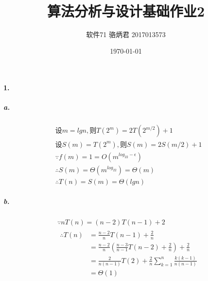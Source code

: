 \documentclass[UTF8]{ctexart}
\title{算法分析与设计基础作业2}
\author{软件71 骆炳君 2017013573}
\date{\today}
\begin{document}
\maketitle
{}

\paragraph{1.}
\subparagraph{a.}
\begin{align*}
    &\text{设}m=lgn,\text{则}T(2^m)=2T(2^{m/2})+1\\
    &\text{设}S(m)=T(2^m),\text{则}S(m)=2S(m/2)+1\\
    &\because f(m)=1=O(m^{log_22-\epsilon})\\
    &\therefore S(m)=\Theta(m^{log_22})=\Theta(m)\\
    &\therefore T(n)=S(m)=\Theta(lgn)
\end{align*}

\subparagraph{b.}
\begin{align*}
    &\because nT(n)=(n-2)T(n-1)+2\\
    &
    \begin{aligned}
        \therefore T(n)&=\frac{n-2}{n}T(n-1)+\frac{2}{n}\\
        &=\frac{n-2}{n}(\frac{n-3}{n-1}T(n-2)+\frac{2}{n})+\frac{2}{n}\\
        &=\frac{2}{n(n-1)}T(2)+\frac{2}{n}\sum_{k=1}^{n}\frac{k(k-1)}{n(n-1)}\\
        &=\Theta(1)
    \end{aligned}
\end{align*}
\end{document}
